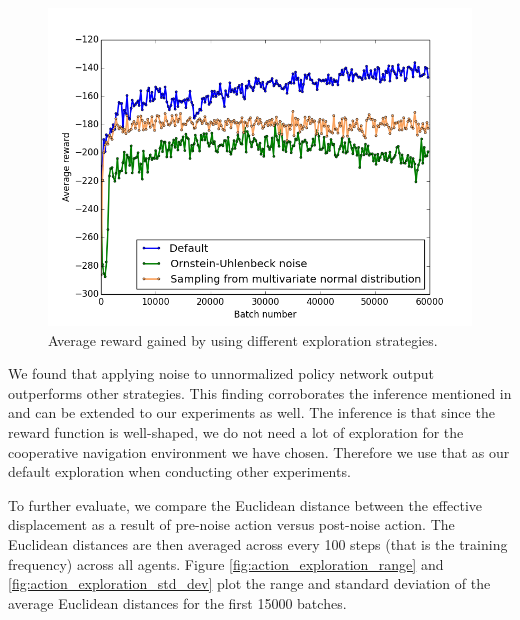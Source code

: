\documentclass{article}
\begin{document}
\begin{figure}
\begin{center}
\includegraphics[scale=0.4]{defaultVSouVSdist}
\end{center}
\caption{Average reward gained by using different exploration strategies.}
\label{fig:defaultVSouVSdist}
\end{figure}

We found that applying noise to unnormalized policy network output outperforms other strategies. This finding corroborates the inference mentioned in \cite{plappert2017parameter} and can be extended to our experiments as well. The inference is that since the reward function is well-shaped, we do not need a lot of exploration for the cooperative navigation environment we have chosen. Therefore we use that as our default exploration when conducting other experiments. 

To further evaluate, we compare the Euclidean distance between the effective displacement as a result of pre-noise action versus post-noise action. The Euclidean distances are then averaged across every 100 steps (that is the training frequency) across all agents. Figure \ref{fig:action_exploration_range} and \ref{fig:action_exploration_std_dev} plot the range and standard deviation of the average Euclidean distances for the first 15000 batches.
\end{document}
